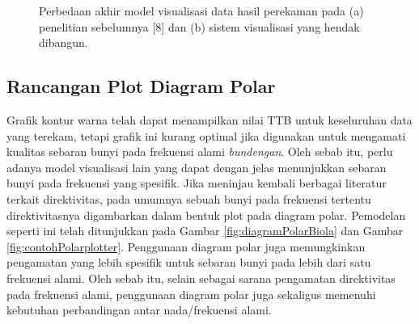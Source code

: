 \begin{figure}[b!]
	\centering
	\caption{Perbedaan akhir model visualisasi data hasil perekaman pada (a) penelitian sebelumnya [8] dan (b) sistem visualisasi yang hendak dibangun.}
	\label{fig:mesh-kontur-bf}
\end{figure}

\subsection{Rancangan Plot Diagram Polar}
Grafik kontur warna telah dapat menampilkan nilai TTB untuk keseluruhan data yang terekam, tetapi grafik ini kurang optimal jika digunakan untuk mengamati kualitas sebaran bunyi pada frekuensi alami \emph{bundengan}. Oleh sebab itu, perlu adanya model visualisasi lain yang dapat dengan jelas menunjukkan sebaran bunyi pada frekuensi yang spesifik. Jika meninjau kembali berbagai literatur terkait direktivitas, pada umumnya sebuah bunyi pada frekuensi tertentu direktivitasnya digambarkan dalam bentuk plot pada diagram polar. Pemodelan seperti ini telah ditunjukkan pada Gambar \ref{fig:diagramPolarBiola} dan Gambar \ref{fig:contohPolarplotter}. Penggunaan diagram polar juga memungkinkan pengamatan yang lebih spesifik untuk sebaran bunyi pada lebih dari satu frekuensi alami. Oleh sebab itu, selain sebagai sarana pengamatan direktivitas pada frekuensi alami, penggunaan diagram polar juga sekaligus memenuhi kebutuhan perbandingan antar nada/frekuensi alami. \par 


